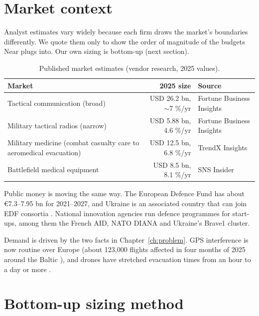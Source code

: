 \section{Market context}

Analyst estimates vary widely because each firm draws the market's boundaries differently. We quote them only to
show the order of magnitude of the budgets Near plugs into. Our own sizing is bottom-up (next section).

\begin{table}[htbp]\centering\small
\caption{Published market estimates (vendor research, 2025 values).}\label{tab:market}
\begin{tabularx}{\linewidth}{Xrl}
\toprule
Market & 2025 size & Source\\
\midrule
Tactical communication (broad) & USD 26.2 bn, $\sim$7 \%/yr & Fortune Business Insights \cite{fbi-tac}\\
Military tactical radios (narrow) & USD 5.88 bn, 4.6 \%/yr & Fortune Business Insights \cite{fbi-radio}\\
Military medicine (combat casualty care to aeromedical evacuation) & USD 12.5 bn, 6.8 \%/yr & TrendX Insights \cite{milmed}\\
Battlefield medical equipment & USD 8.5 bn, 8.1 \%/yr & SNS Insider \cite{battlemed}\\
\bottomrule
\end{tabularx}
\end{table}

Public money is moving the same way. The European Defence Fund has about €7.3--7.95 bn for 2021--2027, and Ukraine is an
associated country that can join EDF consortia \cite{edf,consilium}. National innovation agencies run defence
programmes for start-ups, among them the French AID, NATO DIANA and Ukraine's Brave1 cluster.

Demand is driven by the two facts in Chapter~\ref{ch:problem}. GPS interference is now routine over Europe (about 123,000
flights affected in four months of 2025 around the Baltic \cite{gps123k}), and drones have stretched evacuation times
from an hour to a day or more \cite{goldenday,wotr}.

\section{Bottom-up sizing method}

